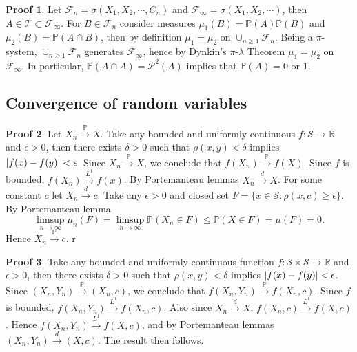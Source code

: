 \documentclass[hidelinks,11pt]{article}
\theoremstyle{definition}
\theoremstyle{dotless}
\newtheorem{prop}{Proof}[section]
\theoremstyle{remark}
\DeclareMathOperator{\1}{\mathbf{1}}
\DeclareMathOperator{\0}{\mathbf{0}}
\begin{document}
\begin{prop}
Let $\mathcal{F}_n=\sigma(X_1,X_2,\cdots,C_n)$ and $\mathcal{F}_\infty=\sigma(X_1,X_2,\cdots)$, then $A\in\mathcal{T}\subset\mathcal{F}_\infty$. For $B\in\mathcal{F}_n$ consider measures $\mu_1(B)=\mathbb{P}(A)\mathbb{P}(B)$ and $\mu_2(B)=\mathbb{P}(A\cap B)$, then by definition $\mu_1=\mu_2$ on $\cup_{n\geq1}\mathcal{F}_n$. Being a $\pi$-system, $\cup_{n\geq1}\mathcal{F}_n$ generates $\mathcal{F}_\infty$, hence by Dynkin's $\pi$-$\lambda$ Theorem $\mu_1=\mu_2$ on $\mathcal{F}_\infty$. In particular, $\mathbb{P}(A\cap A)=\mathcal{P}^2(A)$ implies that $\mathbb{P}(A)=0$ or $1$.
\end{prop}

\subsection{Convergence of random variables}

\begin{prop}
Let $X_n\xrightarrow{\mathbb{P}}X$. Take any bounded and uniformly continuous $f:\mathcal{S}\to\mathbb{R}$ and $\epsilon>0$, then there exists $\delta>0$ such that $\rho(x,y)<\delta$ implies $\abs{f(x)-f(y)}<\epsilon$. Since $X_n\xrightarrow{\mathbb{P}}X$, we conclude that $f(X_n)\xrightarrow{\mathbb{P}}f(X)$. Since $f$ is bounded, $f(X_n)\xrightarrow{L^1}f(x)$. By Portemanteau lemmas $X_n\xrightarrow{d}X$.\medbreak
For some constant $c$ let $X_n\xrightarrow{d}c$. Take any $\epsilon>0$ and closed set $F=\{x\in\mathcal{S}:\rho(x,c)\geq\epsilon\}$. By Portemanteau lemma
\[\limsup_{n\to\infty}\mu_n(F)=\limsup_{n\to\infty}\mathbb{P}(X_n\in F)\leq\mathbb{P}(X\in F)=\mu(F)=0.\]
Hence $X_n\xrightarrow{\mathbb{P}}c$.\medbreak
r
\end{prop}

\begin{prop}
Take any bounded and uniformly continuous function $f:\mathcal{S}\times\mathcal{S}\to\mathbb{R}$ and $\epsilon>0$, then there exists $\delta>0$ such that $\rho(x,y)<\delta$ implies $\abs{f(x)-f(y)}<\epsilon$. Since $(X_n,Y_n)\xrightarrow{\mathbb{P}}(X_n,c)$, we conclude that $f(X_n,Y_n)\xrightarrow{\mathbb{P}}f(X_n,c)$. Since $f$ is bounded, $f(X_n,Y_n)\xrightarrow{L^1}f(X_n,c)$. Also since $X_n\xrightarrow{d}X$, $f(X_n,c)\xrightarrow{L^1}f(X,c)$. Hence $f(X_n,Y_n)\xrightarrow{L^1}f(X,c)$, and by Portemanteau lemmas $(X_n,Y_n)\xrightarrow{d}(X,c)$. The result then follows.
\end{prop}
\end{document}
